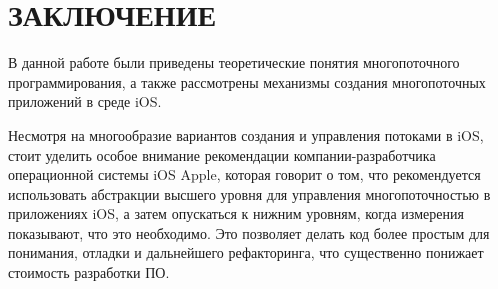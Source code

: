 \section*{ЗАКЛЮЧЕНИЕ}

В данной работе были приведены теоретические понятия многопоточного
программирования, а также рассмотрены механизмы создания многопоточных
приложений в среде iOS.

Несмотря на многообразие вариантов создания и управления потоками в iOS,
стоит уделить особое внимание рекомендации компании-разработчика операционной
системы iOS Apple, которая говорит о том, что рекомендуется использовать
абстракции высшего уровня для управления многопоточностью в приложениях iOS,
а затем опускаться к нижним уровням, когда измерения показывают,
что это необходимо. Это позволяет делать код более простым для понимания,
отладки и дальнейшего рефакторинга, что существенно понижает стоимость
разработки ПО.

\pagebreak
